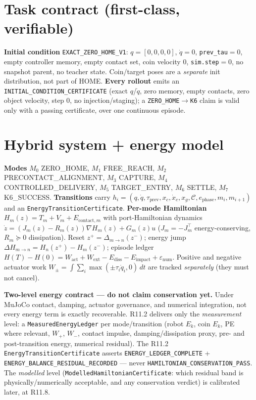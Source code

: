 \documentclass[11pt]{article}
\newcommand{\code}[1]{\texttt{\small #1}}
\newcommand{\gate}[1]{\textcolor{blue!55!black}{\texttt{\small #1}}}
\begin{document}
\section{Task contract (first-class, verifiable)}
\textbf{Initial condition} \code{EXACT\_ZERO\_HOME\_V1}: $q{=}[0,0,0,0]$, $\dot q{=}0$, \code{prev\_tau}$=0$, empty
controller memory, empty contact set, coin velocity $0$, \code{sim.step}$=0$, no snapshot parent, no teacher state.
Coin/target poses are a \emph{separate} init distribution, not part of HOME. \textbf{Every rollout} emits an
\code{INITIAL\_CONDITION\_CERTIFICATE} (exact $q$/$\dot q$, zero memory, empty contacts, zero object velocity, step $0$, no
injection/staging); a \code{ZERO\_HOME$\to$K6} claim is valid only with a passing certificate, over one continuous episode.

\section{Hybrid system + energy model}
\textbf{Modes} $M_0$ ZERO\_HOME, $M_1$ FREE\_REACH, $M_2$ PRECONTACT\_ALIGNMENT, $M_3$ CAPTURE, $M_4$
CONTROLLED\_DELIVERY, $M_5$ TARGET\_ENTRY, $M_6$ SETTLE, $M_7$ K6\_SUCCESS. \textbf{Transitions} carry
$h_i=(q,\dot q,\tau_{\mathrm{prev}},x_c,\dot x_c,x_g,\mathcal C,e_{\mathrm{phase}},m_i,m_{i+1})$ and an
\code{EnergyTransitionCertificate}. \textbf{Per-mode Hamiltonian}
$H_m(z)=T_m+V_m+E_{\mathrm{contact},m}$ with port-Hamiltonian dynamics
$\dot z=(J_m(z)-R_m(z))\nabla H_m(z)+G_m(z)u$ ($J_m{=}{-}J_m^\top$ energy-conserving, $R_m\succeq0$ dissipation). Reset
$z^+=\Delta_{m\to n}(z^-)$; energy jump $\Delta H_{m\to n}=H_n(z^+)-H_m(z^-)$; episode ledger
$H(T)-H(0)=W_{\mathrm{act}}+W_{\mathrm{ext}}-E_{\mathrm{diss}}-E_{\mathrm{impact}}+\varepsilon_{\mathrm{num}}$. Positive and
negative actuator work $W_\pm=\int\sum_i\max(\pm\tau_i\dot q_i,0)\,dt$ are tracked \emph{separately} (they must not cancel).

\textbf{Two-level energy contract --- do not claim conservation yet.} Under MuJoCo contact, damping, actuator governance,
and numerical integration, not every energy term is exactly recoverable. R11.2 delivers only the \emph{measurement}
level: a \code{MeasuredEnergyLedger} per mode/transition (robot $E_k$, coin $E_k$, PE where relevant, $W_+$, $W_-$,
contact impulse, damping/dissipation proxy, pre- and post-transition energy, numerical residual). The R11.2
\code{EnergyTransitionCertificate} asserts \gate{ENERGY\_LEDGER\_COMPLETE} + \gate{ENERGY\_BALANCE\_RESIDUAL\_RECORDED} ---
never \gate{HAMILTONIAN\_CONSERVATION\_PASS}. The \emph{modelled} level (\code{ModelledHamiltonianCertificate}: which
residual band is physically/numerically acceptable, and any conservation verdict) is calibrated later, at R11.8.
\end{document}

